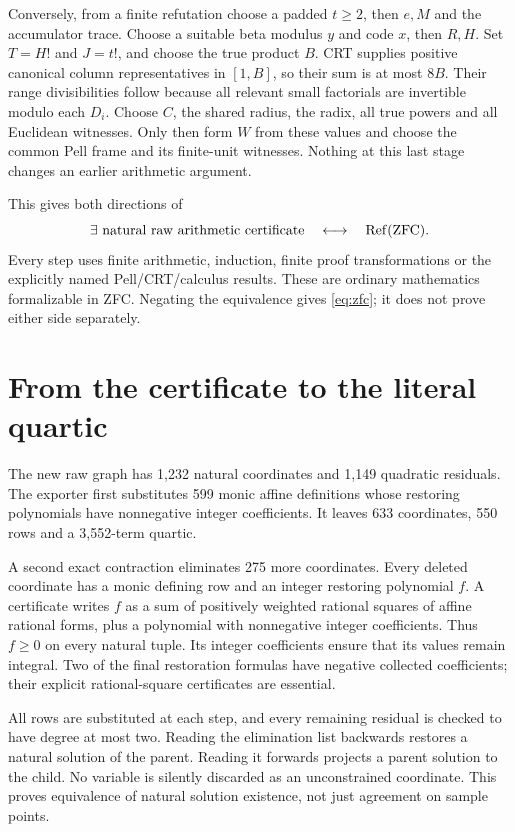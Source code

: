 \documentclass[11pt]{article}
\theoremstyle{definition}\newtheorem{definition}[theorem]{Definition}
\begin{document}
Conversely, from a finite refutation choose a padded $t\ge2$, then $e,M$
and the accumulator trace. Choose a suitable beta modulus $y$ and code
$x$, then $R,H$. Set $T=H!$ and $J=t!$, and choose the true product
$B$. CRT supplies positive canonical column representatives in $[1,B]$,
so their sum is at most $8B$. Their range divisibilities follow because
all relevant small factorials are invertible modulo each $D_i$.
Choose $C$, the shared radius, the radix, all true powers and all
Euclidean witnesses. Only then form $W$ from these values and choose
the common Pell frame and its finite-unit witnesses. Nothing at this
last stage changes an earlier arithmetic argument.

This gives both directions of
\[
 \exists\text{ natural raw arithmetic certificate}
 \quad\longleftrightarrow\quad\operatorname{Ref}(\mathrm{ZFC}).
\]
Every step uses finite arithmetic, induction, finite proof transformations
or the explicitly named Pell/CRT/calculus results. These are ordinary
mathematics formalizable in ZFC. Negating the equivalence gives
\eqref{eq:zfc}; it does not prove either side separately.

\section{From the certificate to the literal quartic}
The new raw graph has 1,232 natural coordinates and 1,149 quadratic
residuals. The exporter first substitutes 599 monic affine definitions
whose restoring polynomials have nonnegative integer coefficients.
It leaves 633 coordinates, 550 rows and a 3,552-term quartic.

A second exact contraction eliminates 275 more coordinates. Every
deleted coordinate has a monic defining row and an integer restoring
polynomial $f$. A certificate writes $f$ as a sum of positively weighted
rational squares of affine rational forms, plus a polynomial with
nonnegative integer coefficients. Thus $f\ge0$ on every natural tuple.
Its integer coefficients ensure that its values remain integral.
Two of the final restoration formulas have negative collected
coefficients; their explicit rational-square certificates are essential.

All rows are substituted at each step, and every remaining residual
is checked to have degree at most two. Reading the elimination list
backwards restores a natural solution of the parent. Reading it forwards
projects a parent solution to the child. No variable is silently
discarded as an unconstrained coordinate. This proves equivalence of
natural solution existence, not just agreement on sample points.
\end{document}
